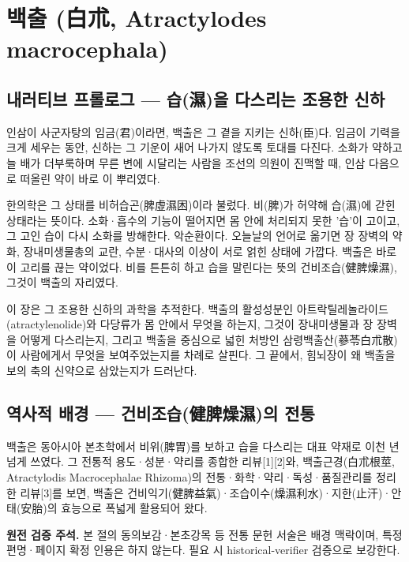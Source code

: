 \documentclass[12pt,oneside]{book}
\newenvironment{authnote}
  {\par\smallskip\begingroup\leftskip=6mm\rightskip=3mm\small\color{muted}\noindent\ignorespaces}
  {\par\endgroup\smallskip}
\newcommand{\refend}{\endgroup\par}
\begin{document}
\refend


\chapter{백출 (白朮, Atractylodes macrocephala)}

\section{내러티브 프롤로그 — 습(濕)을 다스리는 조용한 신하}

인삼이 사군자탕의 임금(君)이라면, 백출은 그 곁을 지키는 신하(臣)다. 임금이 기력을 크게 세우는 동안, 신하는 그 기운이 새어 나가지 않도록 토대를 다진다. 소화가 약하고 늘 배가 더부룩하며 무른 변에 시달리는 사람을 조선의 의원이 진맥할 때, 인삼 다음으로 떠올린 약이 바로 이 뿌리였다.

한의학은 그 상태를 비허습곤(脾虛濕困)이라 불렀다. 비(脾)가 허약해 습(濕)에 갇힌 상태라는 뜻이다. 소화·흡수의 기능이 떨어지면 몸 안에 처리되지 못한 '습'이 고이고, 그 고인 습이 다시 소화를 방해한다. 악순환이다. 오늘날의 언어로 옮기면 장 장벽의 약화, 장내미생물총의 교란, 수분·대사의 이상이 서로 얽힌 상태에 가깝다. 백출은 바로 이 고리를 끊는 약이었다. 비를 튼튼히 하고 습을 말린다는 뜻의 건비조습(健脾燥濕), 그것이 백출의 자리였다.

이 장은 그 조용한 신하의 과학을 추적한다. 백출의 활성성분인 아트락틸레놀라이드(atractylenolide)와 다당류가 몸 안에서 무엇을 하는지, 그것이 장내미생물과 장 장벽을 어떻게 다스리는지, 그리고 백출을 중심으로 넓힌 처방인 삼령백출산(蔘苓白朮散)이 사람에게서 무엇을 보여주었는지를 차례로 살핀다. 그 끝에서, 힘뇌장이 왜 백출을 보의 축의 신약으로 삼았는지가 드러난다.

\section{역사적 배경 — 건비조습(健脾燥濕)의 전통}

백출은 동아시아 본초학에서 비위(脾胃)를 보하고 습을 다스리는 대표 약재로 이천 년 넘게 쓰였다. 그 전통적 용도·성분·약리를 종합한 리뷰[1][2]와, 백출근경(白朮根莖, Atractylodis Macrocephalae Rhizoma)의 전통·화학·약리·독성·품질관리를 정리한 리뷰[3]를 보면, 백출은 건비익기(健脾益氣)·조습이수(燥濕利水)·지한(止汗)·안태(安胎)의 효능으로 폭넓게 활용되어 왔다.

\begin{authnote}\textbf{원전 검증 주석.} 본 절의 동의보감·본초강목 등 전통 문헌 서술은 배경 맥락이며, 특정 편명·페이지 확정 인용은 하지 않는다. 필요 시 historical-verifier 검증으로 보강한다.\end{authnote}
\end{document}
